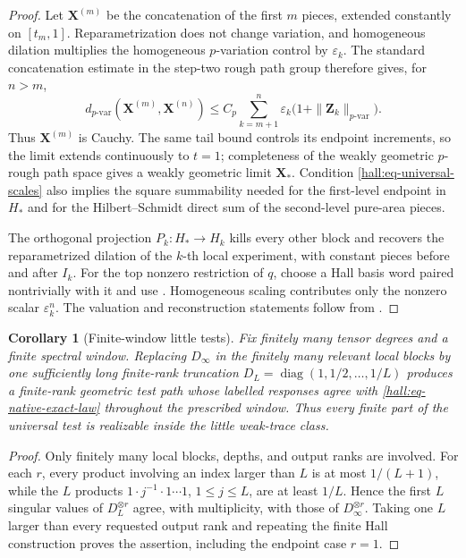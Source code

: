 \documentclass[10pt,reqno]{amsart}
\theoremstyle{plain}
\newtheorem{corollary}[theorem]{Corollary}
\theoremstyle{definition}
\theoremstyle{remark}
\begin{document}
\begin{proof}
Let $\mathbf X^{(m)}$ be the concatenation of the first $m$ pieces, extended
constantly on $[t_m,1]$.  Reparametrization does not change variation, and
homogeneous dilation multiplies the homogeneous $p$-variation control by
$\varepsilon_k$.  The standard concatenation estimate in the step-two rough
path group therefore gives, for $n>m$,
\[
 d_{p\text{-var}}(\mathbf X^{(m)},\mathbf X^{(n)})
 \le C_p\sum_{k=m+1}^n
 \varepsilon_k\bigl(1+\|\mathbf Z_k\|_{p\text{-var}}\bigr).
\]
Thus $\mathbf X^{(m)}$ is Cauchy.  The same tail bound controls its endpoint
increments, so the limit extends continuously to $t=1$; completeness of the
weakly geometric $p$-rough path space gives a weakly geometric limit
$\mathbf X_*$.  Condition \eqref{hall:eq-universal-scales} also implies the
square summability needed for the first-level endpoint in $H_*$ and for the
Hilbert--Schmidt direct sum of the second-level pure-area pieces.

The orthogonal projection $P_k:H_*\to H_k$ kills every other block and
recovers the reparametrized dilation of the $k$-th local experiment, with
constant pieces before and after $I_k$.  For the top nonzero restriction of
$q$, choose a Hall basis word paired nontrivially with it and use
.  Homogeneous scaling contributes only the
nonzero scalar $\varepsilon_k^n$.  The valuation and reconstruction
statements follow from .
\end{proof}

\begin{corollary}[Finite-window little tests]
\label{hall:cor-finite-window}
Fix finitely many tensor degrees and a finite spectral window.  Replacing
$D_\infty$ in the finitely many relevant local blocks by one sufficiently
long finite-rank truncation
$D_L=\operatorname{diag}(1,1/2,\ldots,1/L)$ produces a finite-rank geometric
test path whose labelled responses agree with
\eqref{hall:eq-native-exact-law} throughout the prescribed window.  Thus
every finite part of the universal test is realizable inside the little
weak-trace class.
\end{corollary}

\begin{proof}
Only finitely many local blocks, depths, and output ranks are involved.  For
each $r$, every product involving an index larger than $L$ is at most
$1/(L+1)$, while the $L$ products
$1\cdot j^{-1}\cdot1\cdots1$, $1\le j\le L$, are at least $1/L$.
Hence the first $L$ singular values of $D_L^{\otimes r}$ agree, with
multiplicity, with those of $D_\infty^{\otimes r}$.  Taking one $L$ larger
than every requested output rank and repeating the finite Hall construction
proves the assertion, including the endpoint case $r=1$.
\end{proof}
\end{document}
